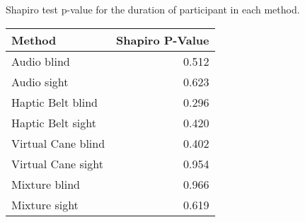 
\centering
\caption{Shapiro test p-value for the duration of participant in each method.}
\label{tab:shapiro_duration}
\begin{tabular}{lr}
\toprule
            Method &  Shapiro P-Value \\
\midrule
       Audio blind &            0.512 \\
       Audio sight &            0.623 \\
 Haptic Belt blind &            0.296 \\
 Haptic Belt sight &            0.420 \\
Virtual Cane blind &            0.402 \\
Virtual Cane sight &            0.954 \\
     Mixture blind &            0.966 \\
     Mixture sight &            0.619 \\
\bottomrule
\end{tabular}
